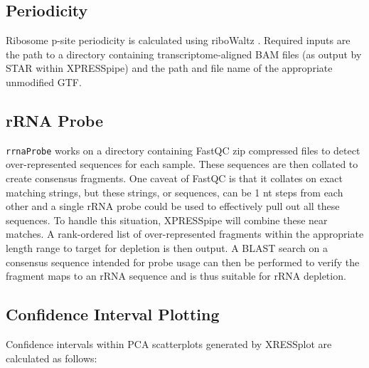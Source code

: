\documentclass[10pt, oneside]{article}
\begin{document}
\subsection*{Periodicity}
Ribosome p-site periodicity is calculated using riboWaltz \cite{ribowaltz}. Required inputs are the path to a directory containing transcriptome-aligned BAM files (as output by STAR within XPRESSpipe) and the path and file name of the appropriate unmodified GTF.\\

\subsection*{rRNA Probe}
\texttt{rrnaProbe} works on a directory containing FastQC \cite{fastqc} zip compressed files to detect over-represented sequences for each sample. These sequences are then collated to create consensus fragments. One caveat of FastQC is that it collates on exact matching strings, but these strings, or sequences, can be 1 nt steps from each other and a single rRNA probe could be used to effectively pull out all these sequences. To handle this situation, XPRESSpipe will combine these near matches. A rank-ordered list of over-represented fragments within the appropriate length range to target for depletion is then output. A BLAST \cite{blast} search on a consensus sequence intended for probe usage can then be performed to verify the fragment maps to an rRNA sequence and is thus suitable for rRNA depletion.\\

\subsection*{Confidence Interval Plotting}
Confidence intervals within PCA scatterplots generated by XRESSplot are calculated as follows:
\end{document}
